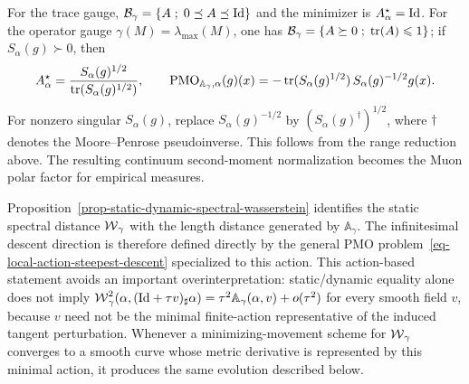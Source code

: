 For the trace gauge, $\mathcal B_\gamma=\left\{ A \;;\; 0\preceq A\preceq\mathrm{Id} \right\}$ and the minimizer is $A_\alpha^\star=\mathrm{Id}$. For the operator gauge $\gamma(M)=\lambda_{\max}(M)$, one has $\mathcal B_\gamma=\left\{ A\succeq0 \;;\; \operatorname{tr}(A)\leqslant1 \right\}$; if $S_\alpha(g)\succ0$, then
\[
	A_\alpha^\star
	=
	\frac{S_\alpha(g)^{1/2}}{\operatorname{tr}(S_\alpha(g)^{1/2})},
	\qquad
	\operatorname{PMO}_{\mathbb A_\gamma,\alpha}(g)(x)
	=
	-\operatorname{tr}(S_\alpha(g)^{1/2})\,S_\alpha(g)^{-1/2}g(x).
\]
For nonzero singular $S_\alpha(g)$, replace $S_\alpha(g)^{-1/2}$ by $(S_\alpha(g)^\dagger)^{1/2}$, where $\dagger$ denotes the Moore--Penrose pseudoinverse. This follows from the range reduction above. The resulting continuum second-moment normalization becomes the Muon polar factor for empirical measures.

Proposition~\ref{prop-static-dynamic-spectral-wasserstein} identifies the static spectral distance $\operatorname{\mathcal{W}}_\gamma$ with the length distance generated by $\mathbb A_\gamma$. The infinitesimal descent direction is therefore defined directly by the general PMO problem~\eqref{eq-local-action-steepest-descent} specialized to this action. This action-based statement avoids an important overinterpretation: static/dynamic equality alone does not imply
\(\operatorname{\mathcal{W}}_\gamma^2(\alpha,(\mathrm{Id}+\tau v)_\sharp\alpha)=\tau^2\mathbb A_\gamma(\alpha,v)+o(\tau^2)\)
for every smooth field $v$, because $v$ need not be the minimal finite-action representative of the induced tangent perturbation. Whenever a minimizing-movement scheme for $\operatorname{\mathcal{W}}_\gamma$ converges to a smooth curve whose metric derivative is represented by this minimal action, it produces the same evolution described below.

